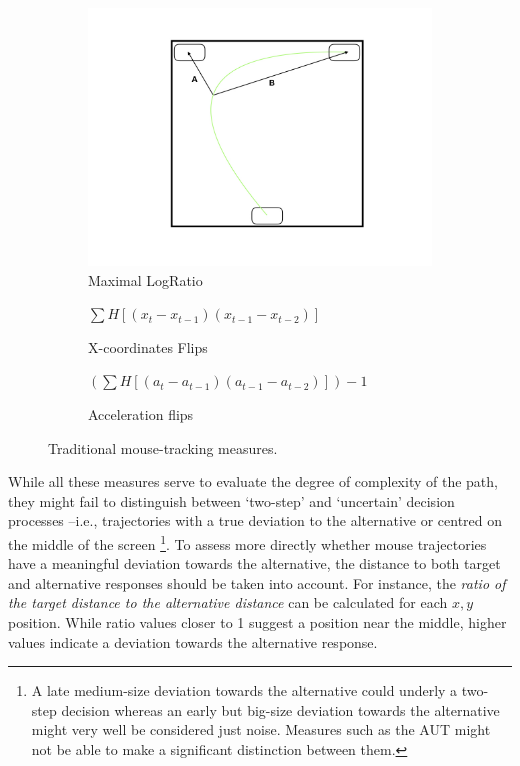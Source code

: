 \documentclass{article}
\begin{document}
\begin{figure}
\begin{subfigure}[b]{0.3\textwidth}
\includegraphics[width=\textwidth]{MaxRatio.jpeg}
\caption{Maximal LogRatio}
\end{subfigure}
\vspace{.5cm}

\begin{subfigure}[b]{0.45\textwidth}
\caption{X-coordinates Flips}
\centering
\(\sum H[(x_{t} - x_{t-1})(x_{t-1} - x_{t-2})] \)
\end{subfigure}
%
\begin{subfigure}[b]{0.45\textwidth}
\caption{Acceleration flips}
\centering
\((\sum H[( a_{t} - a_{t-1})( a_{t-1} - a_{t-2})])-1 \)

\end{subfigure}

\caption{Traditional mouse-tracking measures.}
\label{fig:traditional-measures}

\end{figure}



While all these measures serve to evaluate the degree of complexity of the path, they might fail to distinguish between `two-step' and `uncertain' decision processes --i.e., trajectories with a true deviation to the alternative or centred on the middle of the screen%
%
\footnote{A late medium-size deviation towards the alternative could underly a two-step decision whereas an early but big-size deviation towards the alternative might very well be considered just noise. Measures such as the AUT might not be able to make a significant distinction between them.}. 
To assess more directly whether mouse trajectories have a meaningful deviation towards the alternative, the distance to both target and alternative responses should be taken into account. 
For instance, the \textit{ratio of the target distance to the alternative distance} can be calculated for each $x,y$ position. While ratio values closer to 1 suggest a position near the middle, higher values indicate a deviation towards the alternative response. 
\end{document}
